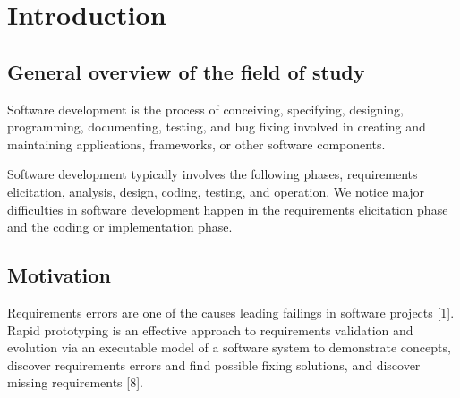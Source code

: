 \chapter{Introduction}



\section{General overview of the field of study}
Software development is the process of conceiving, specifying, designing, programming, documenting, testing, and bug fixing involved in creating and maintaining applications, frameworks, or other software components.

Software development typically involves the following phases, requirements elicitation, analysis, design, coding, testing, and operation. We notice major difficulties in software development happen in the requirements elicitation phase and the coding or implementation phase.

\section{Motivation}

Requirements errors are one of the causes leading failings in software projects [1].
Rapid prototyping is an effective approach to requirements validation and evolution via an executable model of a software system to demonstrate concepts, discover requirements errors and find possible fixing solutions, and discover missing requirements [8].

